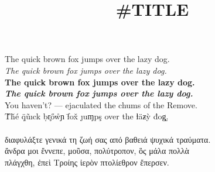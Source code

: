 \documentclass{article}
\title{#TITLE}
\begin{document}
\maketitle

\noindent The quick brown fox jumps over the lazy dog.\\

\noindent \textit{The quick brown fox jumps over the lazy dog.}\\

\noindent \textbf{The quick brown fox jumps over the lazy dog.}\\

\noindent \textbf{\textit{The quick brown fox jumps over the lazy dog.}}\\

\noindent You haven't? --- ejaculated the chums of the Remove.\\

\noindent T̃ȟé q̣̈ũıck ḅr̥őẘɲ f̄ox̌ ȷuɱpş over the ƚäƶỳ đog̫.\\

\\

\noindent διαφυλάξτε γενικά τη ζωή σας από βαθειά ψυχικά τραύματα.\\

\noindent ἄνδρα μοι ἔννεπε, μοῦσα, πολύτροπον, ὃς μάλα πολλὰ\\
\noindent πλάγχθη, ἐπεὶ Τροίης ἱερὸν πτολίεθρον ἔπερσεν.
\end{document}
